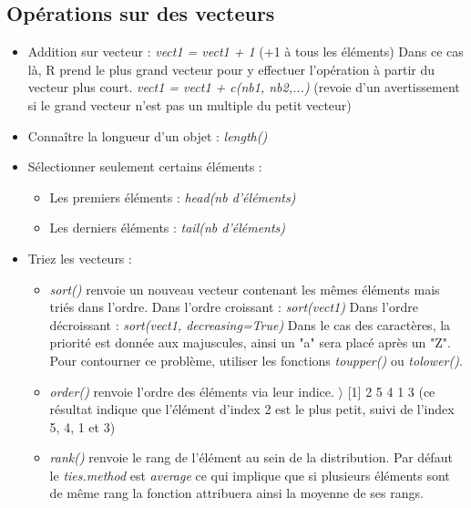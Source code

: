 \documentclass[12pt,a4paper]{article}
\begin{document}
\subsection{Opérations sur des vecteurs}
\begin{itemize}
\item Addition sur vecteur : \textit{vect1 = vect1 + 1} (+1 à tous les éléments)
\newline Dans ce cas là, R prend le plus grand vecteur pour y effectuer l'opération à partir du vecteur plus court.
\newline \textit{vect1 = vect1 + c(nb1, nb2,...)} (revoie d'un avertissement si le grand vecteur n'est pas un multiple du petit vecteur)
\item Connaître la longueur d'un objet : \textit{length()}
\item Sélectionner seulement certains éléments :
\begin{itemize}
\item Les premiers éléments : \textit{head(nb d'éléments)}
\item Les derniers éléments : \textit{tail(nb d'éléments)}
\end{itemize}
\item Triez les vecteurs :
\begin{itemize}
\item \textit{sort()} renvoie un nouveau vecteur contenant les mêmes éléments mais triés dans l'ordre.
\newline Dans l'ordre croissant : \textit{sort(vect1)}
\newline Dans l'ordre décroissant : \textit{sort(vect1, decreasing=True)}
\newline Dans le cas des caractères, la priorité est donnée aux majuscules, ainsi un "a" sera placé après un "Z". Pour contourner ce problème, utiliser les fonctions \textit{toupper()} ou \textit{tolower()}.
\item \textit{order()} renvoie l'ordre des éléments via leur indice.
\newline $\rangle$ [1] 2 5 4 1 3 (ce résultat indique que l'élément d'index 2 est le plus petit, suivi de l'index 5, 4, 1 et 3)
\item \textit{rank()} renvoie le rang de l'élément au sein de la distribution. Par défaut le \textit{ties.method} est \textit{average} ce qui implique que si plusieurs éléments sont de même rang la fonction attribuera ainsi la moyenne de ses rangs.
\end{itemize}
\end{itemize}
\end{document}
